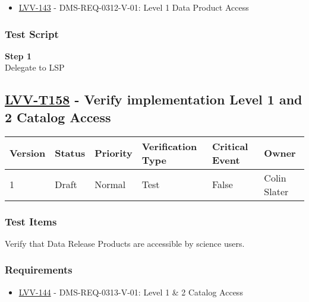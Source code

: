 \begin{itemize}
\tightlist
\item
  \href{https://jira.lsstcorp.org/browse/LVV-143}{LVV-143} -
  DMS-REQ-0312-V-01: Level 1 Data Product Access
\end{itemize}

\subsubsection{Test Script}\label{test-script-24}

\textbf{Step 1}\\
Delegate to LSP\\[2\baselineskip]

\hypertarget{lvv-t158---verify-implementation-level-1-and-2-catalog-access}{\subsection{\texorpdfstring{\href{https://jira.lsstcorp.org/secure/Tests.jspa\#/testCase/LVV-T158}{LVV-T158}
- Verify implementation Level 1 and 2 Catalog
Access}{LVV-T158 - Verify implementation Level 1 and 2 Catalog Access}}\label{lvv-t158---verify-implementation-level-1-and-2-catalog-access}}

\begin{longtable}[]{@{}llllll@{}}
\toprule
Version & Status & Priority & Verification Type & Critical Event &
Owner\tabularnewline
\midrule
\endhead
1 & Draft & Normal & Test & False & Colin Slater\tabularnewline
\bottomrule
\end{longtable}

\subsubsection{Test Items}\label{test-items-25}

Verify that Data Release Products are accessible by science users.

\subsubsection{Requirements}\label{requirements-25}

\begin{itemize}
\tightlist
\item
  \href{https://jira.lsstcorp.org/browse/LVV-144}{LVV-144} -
  DMS-REQ-0313-V-01: Level 1 \& 2 Catalog Access
\end{itemize}


